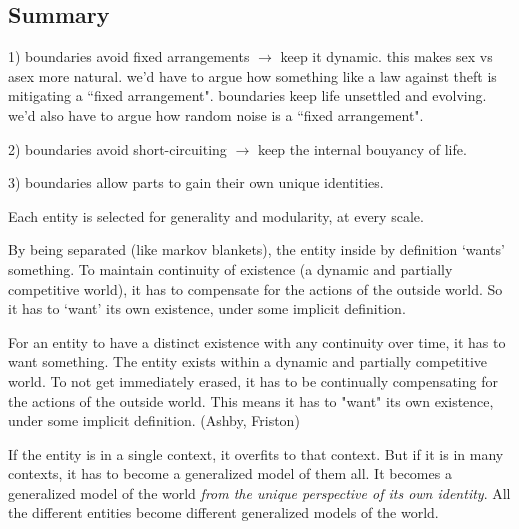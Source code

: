 \documentclass[11pt]{article}
\begin{document}




\subsection{Summary} 


1) boundaries avoid fixed arrangements $\rightarrow$ keep it dynamic. this makes sex vs asex more natural. we'd have to argue how something like a law against theft is mitigating a ``fixed arrangement". boundaries keep life unsettled and evolving. we'd also have to argue how random noise is a ``fixed arrangement".

2) boundaries avoid short-circuiting $\rightarrow$ keep the internal bouyancy of life. 

3) boundaries allow parts to gain their own unique identities.

Each entity is selected for generality and modularity, at every scale.

By being separated (like markov blankets), the entity inside by definition `wants' something. To maintain continuity of existence (a dynamic and partially competitive world), it has to compensate for the actions of the outside world. So it has to `want' its own existence, under some implicit definition. 

For an entity to have a distinct existence with any continuity over time, it has to want something. The entity exists within a dynamic and partially competitive world. To not get immediately erased, it has to be continually compensating for the actions of the outside world. This means it has to "want" its own existence, under some implicit definition. (Ashby, Friston)

If the entity is in a single context, it overfits to that context. But if it is in many contexts, it has to become a generalized model of them all. It becomes a generalized model of the world \textit{from the unique perspective of its own identity}. All the different entities become different generalized models of the world. 
\end{document}
